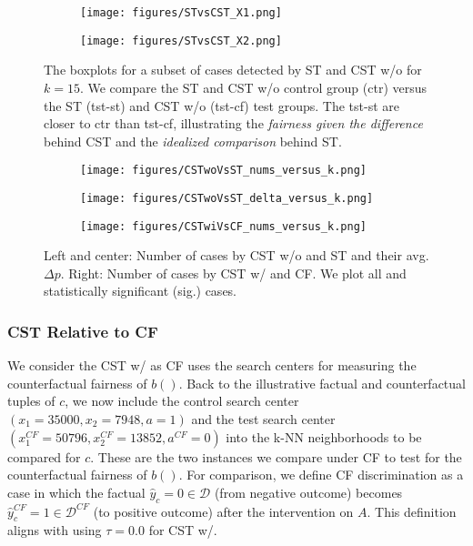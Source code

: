 %
\begin{figure}[t]
    \centering
    \begin{subfigure}{.45\linewidth}
    \texttt{[image: figures/STvsCST\_X1.png]}
    \end{subfigure}
    \hfill
    \begin{subfigure}{.45\linewidth}
    \texttt{[image: figures/STvsCST\_X2.png]}
    \end{subfigure}
\caption{The boxplots for a subset of cases detected by ST and CST w/o for $k=15$. We compare the ST and CST w/o control group (ctr) versus the ST (tst-st) and CST w/o (tst-cf) test groups. 
%
The tst-st are closer to ctr than tst-cf, illustrating the \textit{fairness given the difference} behind CST and the \textit{idealized comparison} behind ST.}
\label{fig:LoanApp_BoxPlots}
\end{figure}
%

%
\begin{figure}[t]
    \centering
    \begin{subfigure}{.32\linewidth}
    \texttt{[image: figures/CSTwoVsST\_nums\_versus\_k.png]}
    \end{subfigure}
    \hfill
    \begin{subfigure}{.32\linewidth}
    \texttt{[image: figures/CSTwoVsST\_delta\_versus\_k.png]}
    \end{subfigure}
    \hfill
    \begin{subfigure}{.32\linewidth}
    \texttt{[image: figures/CSTwiVsCF\_nums\_versus\_k.png]}
    \end{subfigure}
\caption{Left and center: Number of cases by CST w/o and ST and their avg. $\Delta p$. Right: Number of cases by CST w/ and CF. We plot all and statistically significant (sig.) cases.}
\label{fig:CSTwoVsST_k_param}
\label{fig:CSTwiVsCF_k_param}
\end{figure}
%

\subsubsection{CST Relative to CF}
\label{sec:Experiments.IllustrativeExample.CSTvCF}

We consider the CST w/ as CF uses the search centers for measuring the counterfactual fairness of $b()$.
Back to the illustrative factual and counterfactual tuples of $c$, we now include the control search center $(x_1=35000, x_2=7948, a=1)$ and the test search center $(x_1^{CF}=50796, x_2^{CF}=13852, a^{CF}=0)$ into the k-NN neighborhoods to be compared for $c$. 
These are the two instances we compare under CF to test for the counterfactual fairness of $b()$.
For comparison, we define CF discrimination as a case in which the factual $\widehat{y}_c=0 \in \mathcal{D}$ (from negative outcome) becomes $\widehat{y}_c^{CF}=1 \in \mathcal{D}^{CF}$ (to positive outcome) after the intervention on $A$.
This definition aligns with using $\tau=0.0$ for CST w/.

